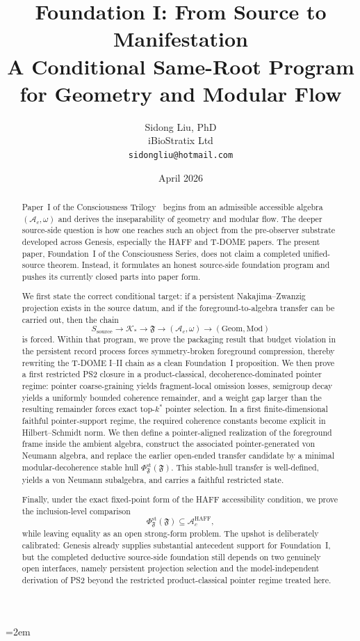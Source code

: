\documentclass[12pt]{article}
\title{%
  \textbf{Foundation I: From Source to Manifestation}\\
  \textbf{A Conditional Same-Root Program for Geometry and Modular Flow}%
}
\author{
  Sidong Liu, PhD \\
  \small iBioStratix Ltd \\
  \small \texttt{sidongliu@hotmail.com}
}
\date{April 2026}
\theoremstyle{definition}
\theoremstyle{remark}
\begin{document}
\emergencystretch=2em
\raggedbottom
{}

\maketitle

\begin{abstract}
Paper~I of the Consciousness Trilogy~\cite{PaperI} begins from an
admissible accessible algebra \((\mathcal A_c,\omega)\) and derives the
inseparability of geometry and modular flow. The deeper source-side
question is how one reaches such an object from the pre-observer
substrate developed across Genesis, especially the HAFF and T-DOME
papers. The present paper, Foundation~I of the Consciousness Series,
does not claim a completed unified-source theorem. Instead, it
formulates an honest source-side foundation program and pushes its
currently closed parts into paper form.

We first state the correct conditional target: if a persistent
Nakajima--Zwanzig projection exists in the source datum, and if the
foreground-to-algebra transfer can be carried out, then the chain
\[
S_{\mathrm{source}} \to \mathcal K_* \to \mathfrak F \to (\mathcal A_c,\omega)
\to (\mathrm{Geom},\mathrm{Mod})
\]
is forced. Within that program, we prove the packaging result that
budget violation in the persistent record process forces
symmetry-broken foreground compression, thereby rewriting the T-DOME
I--II chain as a clean Foundation~I proposition. We then prove a first
restricted PS2 closure in a product-classical, decoherence-dominated
pointer regime: pointer coarse-graining yields fragment-local omission
losses, semigroup decay yields a uniformly bounded coherence remainder,
and a weight gap larger than the resulting remainder forces exact
top-\(k^*\) pointer selection. In a first finite-dimensional faithful
pointer-support regime, the required coherence constants become
explicit in Hilbert--Schmidt norm. We then define a
pointer-aligned realization of the foreground frame inside the ambient
algebra, construct the associated pointer-generated von Neumann
algebra, and replace the earlier open-ended transfer candidate by a
minimal modular-decoherence stable hull
\(\Phi_{\mathfrak F}^{\mathrm{st}}(\mathfrak F)\). This stable-hull
transfer is well-defined, yields a von Neumann subalgebra, and carries a
faithful restricted state.

Finally, under the exact fixed-point form of the HAFF accessibility
condition, we prove the inclusion-level comparison
\[
\Phi_{\mathfrak F}^{\mathrm{st}}(\mathfrak F)\subseteq
\mathcal A_c^{\mathrm{HAFF}},
\]
while leaving equality as an open strong-form problem. The upshot is
deliberately calibrated: Genesis already supplies substantial antecedent
support for Foundation~I, but the completed deductive source-side
foundation still depends on two genuinely open interfaces, namely
persistent projection selection and the model-independent derivation of
PS2 beyond the restricted product-classical pointer regime treated here.
\end{abstract}
\end{document}
